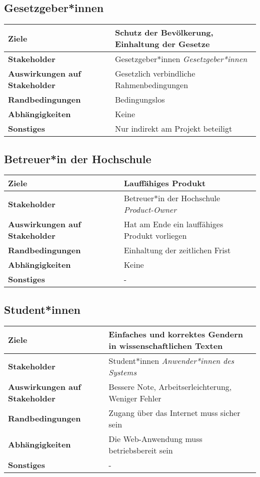 \documentclass[paper=a4, parskip=half]{scrreprt}
\begin{document}
\subsection{Gesetzgeber*innen}
\begin{tabular}
	{
	|p{}
	|p{}
	|
	}
	\hline
	\textbf{Ziele}
	&Schutz der Bevölkerung, Einhaltung der Gesetze\\
	\hline
	\textbf{Stakeholder}
	&Gesetzgeber*innen \newline \textit{Gesetzgeber*innen}\\
	\hline
	\textbf{Auswirkungen auf Stakeholder}
	&Gesetzlich verbindliche Rahmenbedingungen\\
	\hline
	\textbf{Randbedingungen}
	&Bedingungslos\\
	\hline
	\textbf{Abhängigkeiten}
	&Keine\\
	\hline
	\textbf{Sonstiges}
	&Nur indirekt am Projekt beteiligt\\
	\hline
\end{tabular}

\subsection{Betreuer*in der Hochschule}
\begin{tabular}
	{
		|p{}
		|p{}
		|
	}
	\hline
	\textbf{Ziele}
	&Lauffähiges Produkt\\
	\hline
	\textbf{Stakeholder}
	&Betreuer*in der Hochschule \newline \textit{Product-Owner}\\
	\hline
	\textbf{Auswirkungen auf Stakeholder}
	&Hat am Ende ein lauffähiges Produkt vorliegen\\
	\hline
	\textbf{Randbedingungen}
	&Einhaltung der zeitlichen Frist\\
	\hline
	\textbf{Abhängigkeiten}
	&Keine\\
	\hline
	\textbf{Sonstiges}
	&-\\
	\hline
\end{tabular}

\subsection{Student*innen}
\begin{tabular}
	{
	|p{}
	|p{}
	|
	}
	\hline
	\textbf{Ziele}
	&Einfaches und korrektes Gendern in wissenschaftlichen Texten\\
	\hline
	\textbf{Stakeholder}
	&Student*innen
	\newline \textit{Anwender*innen des Systems}\\
	\hline
	\textbf{Auswirkungen auf Stakeholder}
	&Bessere Note, Arbeitserleichterung, Weniger Fehler\\
	\hline
	\textbf{Randbedingungen}
	&Zugang über das Internet muss sicher sein\\
	\hline
	\textbf{Abhängigkeiten}
	&Die Web-Anwendung muss betriebsbereit sein\\
	\hline
	\textbf{Sonstiges}
	&-\\
	\hline
\end{tabular}
\end{document}
